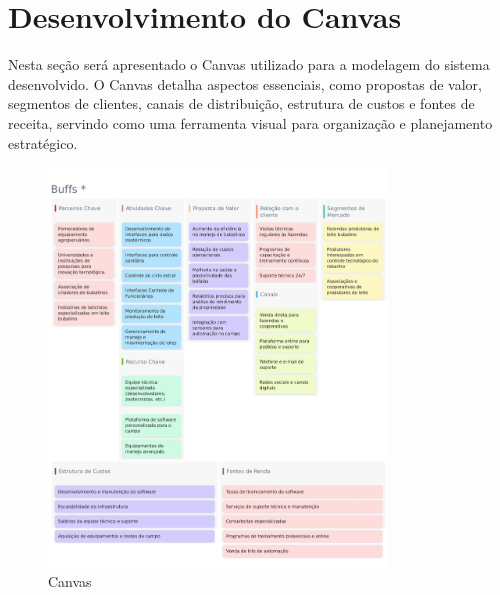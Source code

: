 \documentclass[
  a4paper,%
  12pt,%
  english,%
  brazilian,%
]{article}
\begin{document}
\section*{Desenvolvimento do Canvas}
Nesta seção será apresentado o Canvas utilizado para a modelagem do sistema desenvolvido. O Canvas detalha aspectos essenciais, como propostas de valor, segmentos de clientes, canais de distribuição, estrutura de custos e fontes de receita, servindo como uma ferramenta visual para organização e planejamento estratégico.
     \begin{figure}[h]
\centering
\caption{Canvas}%
\label{fig:canvas}
\includegraphics[width=0.8\textwidth]{Logos/Canvas.png}
\end{figure}

\newpage
\end{document}
